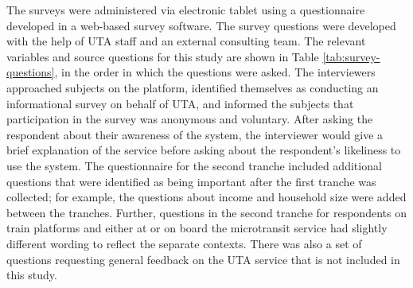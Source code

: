 \documentclass[smartcities,article,submit,moreauthors,pdftex]{mdpi}
\begin{document}
The surveys were administered via electronic tablet using a questionnaire
developed in a web-based survey software. The survey questions were developed
with the help of UTA staff and an external consulting team. The relevant
variables and source questions for this study are shown in Table
\ref{tab:survey-questions}, in the order in which the questions were asked. The
interviewers approached subjects on the platform, identified themselves as conducting
an informational survey on behalf of UTA, and informed the subjects that participation
in the survey was anonymous and voluntary. After
asking the respondent about their awareness of the system, the interviewer would
give a brief explanation of the service before asking about the respondent's
likeliness to use the system. The questionnaire for the second tranche included
additional questions that were identified as being important after the first
tranche was collected; for example, the questions about income and household
size were added between the tranches. Further, questions in the second tranche
for respondents on train platforms and either at or on board the microtransit
service had slightly different wording to reflect the separate contexts. There
was also a set of questions requesting general feedback on the UTA service that
is not included in this study.
\end{document}
